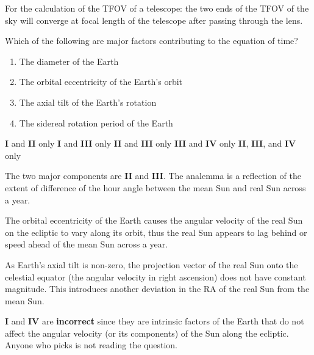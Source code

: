 \documentclass[a4paper,11pt]{exam}
\begin{document}
\begin{questions}
\begin{solution}
		For the calculation of the TFOV of a telescope: the two ends of the TFOV of the sky will converge at focal length of the telescope after passing through the lens.
	\end{solution}

\filbreak
\question
	Which of the following are major factors contributing to the equation of time?
	\begin{enumerate}[align=left,labelsep=0pt,leftmargin=0pt,labelsep=3pt,itemindent=23pt,parsep=6pt,label=\textbf{\Roman{*}}.]
		\item The diameter of the Earth
		\item The orbital eccentricity of the Earth’s orbit
		\item The axial tilt of the Earth’s rotation
		\item The sidereal rotation period of the Earth
	\end{enumerate}
	\begin{choices}
		\choice	\textbf{I} and \textbf{II} only
		\choice	\textbf{I} and \textbf{III} only
		\correctchoice	\textbf{II} and \textbf{III} only
		\choice	\textbf{III} and \textbf{IV} only
		\choice	\textbf{II}, \textbf{III}, and \textbf{IV} only
	\end{choices}
	\begin{solution}
		The two major components are \textbf{II} and \textbf{III}. The analemma is a reflection of the extent of difference of the hour angle between the mean Sun and real Sun across a year.

		The orbital eccentricity of the Earth causes the angular velocity of the real Sun on the ecliptic to vary along its orbit, thus the real Sun appears to lag behind or speed ahead of the mean Sun across a year.

		As Earth’s axial tilt is non-zero, the projection vector of the real Sun onto the celestial equator (the angular velocity in right ascension) does not have constant magnitude. This introduces another deviation in the RA of the real Sun from the mean Sun.

		\textbf{I} and \textbf{IV} are \textbf{incorrect} since they are intrinsic factors of the Earth that do not affect the angular velocity (or its components) of the Sun along the ecliptic.
		Anyone who picks  is not reading the question.
	\end{solution}


\end{questions}
\end{document}
